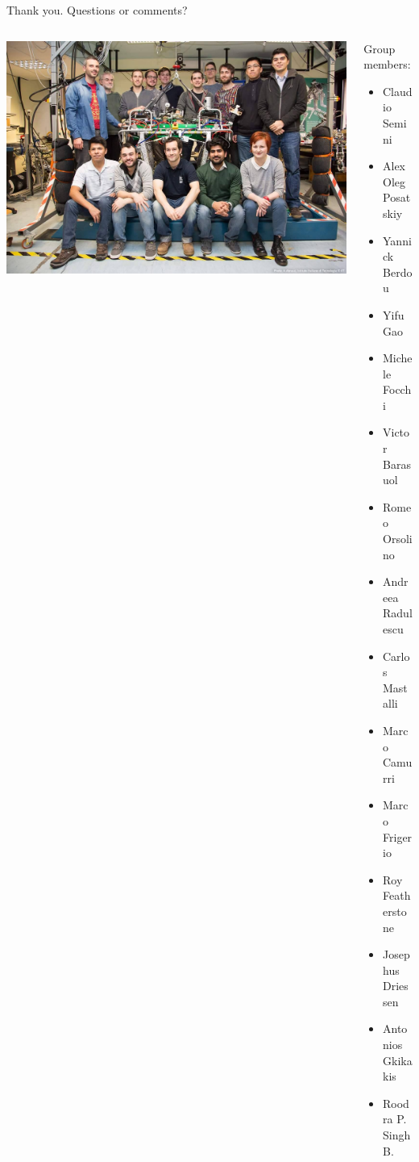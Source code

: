 \documentclass[10pt]{beamer}
\begin{document}
\begin{frame}{Thank you. Questions or comments?}
 \begin{columns}
 \begin{column}{0.7\textwidth}
 \includegraphics[width=1\textwidth]{GroupPicture.jpg}
 \end{column}
 \begin{column}{0.3\textwidth}
 Group members:
 \footnotesize\begin{itemize}\setlength\itemsep{0.07em}
 \item Claudio Semini
 \item Alex Oleg Posatskiy
 \item Yannick Berdou
 \item Yifu Gao
 \item Michele Focchi
 \item Victor Barasuol
 \item Romeo Orsolino
 \item Andreea Radulescu
 \item Carlos Mastalli
 \item Marco Camurri
 \item Marco Frigerio
 \item Roy Featherstone
 \item Josephus Driessen
 \item Antonios Gkikakis
 \item Roodra P. Singh B.
 \end{itemize}
 \end{column}
 \end{columns}
\end{frame}
\end{document}
